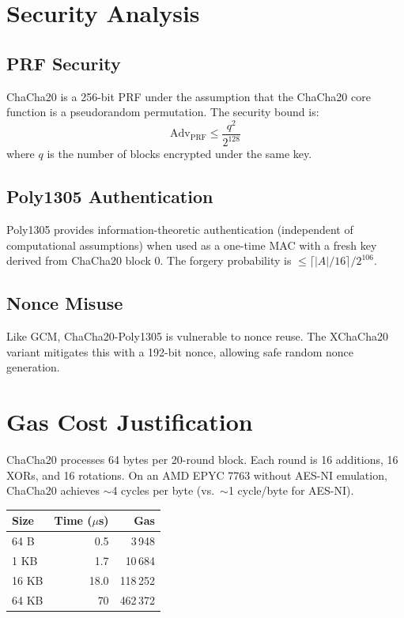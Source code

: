 \documentclass[11pt,a4paper]{article}
\begin{document}
\section{Security Analysis}

\subsection{PRF Security}

ChaCha20 is a 256-bit PRF under the assumption that the ChaCha20 core function
is a pseudorandom permutation. The security bound is:
\[
  \text{Adv}_{\text{PRF}} \leq \frac{q^2}{2^{128}}
\]
where $q$ is the number of blocks encrypted under the same key.

\subsection{Poly1305 Authentication}

Poly1305 provides information-theoretic authentication (independent of
computational assumptions) when used as a one-time MAC with a fresh key derived
from ChaCha20 block 0. The forgery probability is $\leq \lceil |A|/16 \rceil / 2^{106}$.

\subsection{Nonce Misuse}

Like GCM, ChaCha20-Poly1305 is vulnerable to nonce reuse. The XChaCha20 variant
mitigates this with a 192-bit nonce, allowing safe random nonce generation.

\section{Gas Cost Justification}

ChaCha20 processes 64 bytes per 20-round block. Each round is 16 additions,
16 XORs, and 16 rotations. On an AMD EPYC 7763 without AES-NI emulation,
ChaCha20 achieves $\sim$4 cycles per byte (vs.~$\sim$1 cycle/byte for AES-NI).

\begin{table}[H]
\centering
\begin{tabular}{lrr}
\toprule
\textbf{Size} & \textbf{Time ($\mu$s)} & \textbf{Gas} \\
\midrule
64 B & 0.5 & 3\,948 \\
1 KB & 1.7 & 10\,684 \\
16 KB & 18.0 & 118\,252 \\
64 KB & 70 & 462\,372 \\
\bottomrule
\end{tabular}
\end{table}
\end{document}
